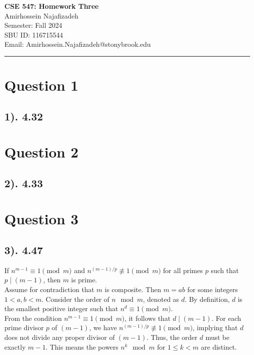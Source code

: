 \documentclass[12pt]{article}
\begin{document}
\begin{center}
    {\LARGE\textbf{CSE 547: Homework Three}} \\[1em]
    {\large Amirhossein Najafizadeh} \\[1em]
    Semester: Fall 2024 \\ 
    SBU ID: 116715544 \\
    Email: Amirhossein.Najafizadeh@stonybrook.edu \\[1em]
    \noindent\rule{\textwidth}{0.6pt}
\end{center}

\section*{Question 1}
\subsection*{1). 4.32}

\section*{Question 2}
\subsection*{2). 4.33}

\section*{Question 3}
\subsection*{3). 4.47}
If $n^{m-1} \equiv 1 \pmod{m}$ and $n^{(m-1)/p} \not\equiv 1 \pmod{m}$ for all primes $p$ such that $p \mid (m-1)$, then $m$ is prime. \\

Assume for contradiction that $m$ is composite. Then $m = ab$ for some integers $1 < a, b < m$.
Consider the order of $n \mod m$, denoted as $d$. By definition, $d$ is the smallest positive integer such that $n^d \equiv 1 \pmod{m}$. \\

From the condition $n^{m-1} \equiv 1 \pmod{m}$, it follows that $d \mid (m-1)$.
For each prime divisor $p$ of $(m-1)$, we have $n^{(m-1)/p} \not\equiv 1 \pmod{m}$, implying that $d$ does not divide any proper divisor of $(m-1)$.
Thus, the order $d$ must be exactly $m-1$. This means the powers $n^k \mod m$ for $1 \leq k < m$ are distinct. \\
\end{document}

